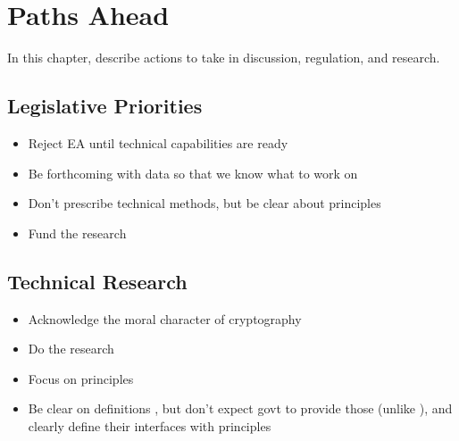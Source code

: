 \chapter{Paths Ahead}
\label{chap-pathsahead}

In this chapter, describe actions to take in discussion, regulation, and research.

\section{Legislative Priorities}

\begin{itemize}
    \item Reject EA until technical capabilities are ready \cite{varia_2018}
    \item Be forthcoming with data so that we know what to work on \cite{devlin_2018}
    \item Don't prescribe technical methods, but be clear about principles \cite{matyas_incommensurability_2018}
    \item Fund the research \cite{varia_2018}
\end{itemize}

\section{Technical Research}

\begin{itemize}
    \item Acknowledge the moral character of cryptography \cite{rogaway_moral_2015}
    \item Do the research
    \item Focus on principles \cite{levy_robinson_2018}
    \item Be clear on definitions \cite{varia_2018}, but don't expect govt to provide those (unlike
            \cite{abelson_2015}), and clearly define their interfaces with principles
            \cite{matyas_incommensurability_2018}
\end{itemize}
